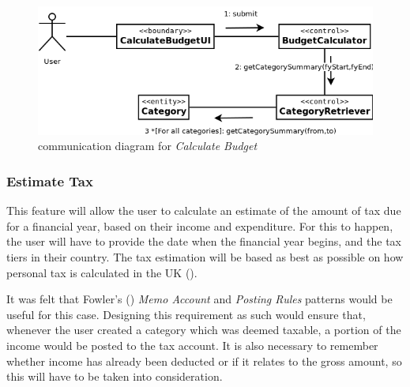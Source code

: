 \begin{figure}[ht!]
  \begin{center}
    \includegraphics[width=14cm]{./contents/img/Comm_Diagram_-_Calculate_Budget.png}
  \end{center}
  \caption{communication diagram for \emph{Calculate Budget}}
  \label{fig:CommDiagram.CalculateBudget}
\end{figure}
\FloatBarrier


\subsubsection{Estimate Tax} \label{sec:AnalysisAndDesign.BusinessLogic.EstimateTax}

This feature will allow the user to calculate an estimate of the amount of tax
due for a financial year, based on their income and expenditure. For this to
happen, the user will have to provide the date when the financial year begins,
and the tax tiers in their country. The tax estimation will be based as best as
possible on how personal tax is calculated in the UK
(\cite[][]{hmrc2018personaltax}). 

It was felt that Fowler's (\citeyear[][Session.~6.4-6.5]{fowler1997analysis})
\emph{Memo Account} and \emph{Posting Rules} patterns would be useful for this
case. Designing this requirement as such would ensure that, whenever the user
created a category which was deemed taxable, a portion of the income would be
posted to the tax account. It is also necessary to remember whether income has
already been deducted or if it relates to the gross amount, so this will have
to be taken into consideration. 


